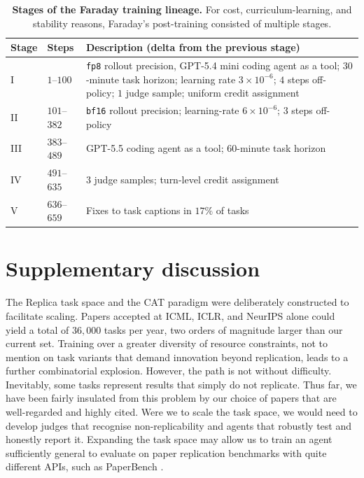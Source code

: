 \documentclass[garamond,a4paper]{inherent}
\begin{document}
\begin{table}[h!]
    \centering
    \caption{
    \textbf{Stages of the Faraday training lineage.}
    For cost, curriculum-learning, and stability reasons, Faraday's post-training consisted of multiple stages.
    }
    \label{tab:training-lineage}
    \small
    \begin{tabular}{@{}llp{10.4cm}@{}}
        \toprule
        Stage & Steps & Description (delta from the previous stage) \\
        \midrule
        I & $1$--$100$ & \texttt{fp8} rollout precision, GPT-5.4 mini coding agent as a tool; $30$-minute task horizon; learning rate $3\times10^{-6}$; $4$ steps off-policy; $1$ judge sample; uniform credit assignment \\
        II & $101$--$382$ & \texttt{bf16} rollout precision; learning-rate $6\times10^{-6}$;
        $3$ steps off-policy \\
        III & $383$--$489$ & GPT-5.5 coding agent as a tool; $60$-minute task horizon \\
        IV & $491$--$635$ & $3$ judge samples; turn-level credit assignment \\
        V & $636$--$659$ & Fixes to task captions in $17\%$ of tasks \\
        \bottomrule
    \end{tabular}
\end{table}

\FloatBarrier
\newpage

\section{Supplementary discussion}
\label{app:supplementary-discussion}

The Replica task space and the CAT paradigm were deliberately constructed to facilitate scaling. Papers accepted at ICML, ICLR, and NeurIPS alone could yield a total of $36{,}000$ tasks per year, two orders of magnitude larger than our current set. 
Training over a greater diversity of resource constraints, not to mention on task variants that demand innovation beyond replication, leads to a further combinatorial explosion.
However, the path is not without difficulty.
Inevitably, some tasks represent results that simply do not replicate.
Thus far, we have been fairly insulated from this problem by our choice of papers that are well-regarded and highly cited.
Were we to scale the task space, we would need to develop judges that recognise non-replicability and agents that robustly test and honestly report it.
Expanding the task space may allow us to train an agent sufficiently general to evaluate on paper replication benchmarks with quite different APIs, such as PaperBench \citep{paperbench}.
\end{document}
